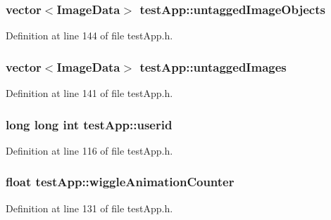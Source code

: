 \hypertarget{classtest_app_ae31cc868f554f62b4c6e4e9db3b4155b}{
\subsubsection[{untagged\-Image\-Objects}]{\setlength{\rightskip}{0pt plus 5cm}vector$<${\bf Image\-Data}$>$ test\-App\-::untagged\-Image\-Objects}}\label{classtest_app_ae31cc868f554f62b4c6e4e9db3b4155b}


Definition at line 144 of file test\-App.\-h.

\hypertarget{classtest_app_a9cb9aa0700c4c8b316329a86c4e650ec}{
\subsubsection[{untagged\-Images}]{\setlength{\rightskip}{0pt plus 5cm}vector$<${\bf Image\-Data}$>$ test\-App\-::untagged\-Images}}\label{classtest_app_a9cb9aa0700c4c8b316329a86c4e650ec}


Definition at line 141 of file test\-App.\-h.

\hypertarget{classtest_app_a6ae76dc97fbeee00755f4a6cd6b87e19}{
\subsubsection[{userid}]{\setlength{\rightskip}{0pt plus 5cm}long long int test\-App\-::userid}}\label{classtest_app_a6ae76dc97fbeee00755f4a6cd6b87e19}


Definition at line 116 of file test\-App.\-h.

\hypertarget{classtest_app_a6073b33be7847d675ec089a1d514c506}{
\subsubsection[{wiggle\-Animation\-Counter}]{\setlength{\rightskip}{0pt plus 5cm}float test\-App\-::wiggle\-Animation\-Counter}}\label{classtest_app_a6073b33be7847d675ec089a1d514c506}


Definition at line 131 of file test\-App.\-h.

